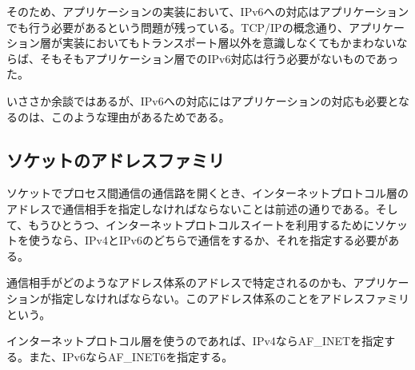 そのため、アプリケーションの実装において、IPv6への対応はアプリケーションでも行う必要があるという問題が残っている。TCP/IPの概念通り、アプリケーション層が実装においてもトランスポート層以外を意識しなくてもかまわないならば、そもそもアプリケーション層でのIPv6対応は行う必要がないものであった。

いささか余談ではあるが、IPv6への対応にはアプリケーションの対応も必要となるのは、このような理由があるためである。

\subsection{ソケットのアドレスファミリ}
ソケットでプロセス間通信の通信路を開くとき、インターネットプロトコル層のアドレスで通信相手を指定しなければならないことは前述の通りである。そして、もうひとうつ、インターネットプロトコルスイートを利用するためにソケットを使うなら、IPv4とIPv6のどちらで通信をするか、それを指定する必要がある。

通信相手がどのようなアドレス体系のアドレスで特定されるのかも、アプリケーションが指定しなければならない。このアドレス体系のことをアドレスファミリという。

インターネットプロトコル層を使うのであれば、IPv4ならAF\_INETを指定する。また、IPv6ならAF\_INET6を指定する。

